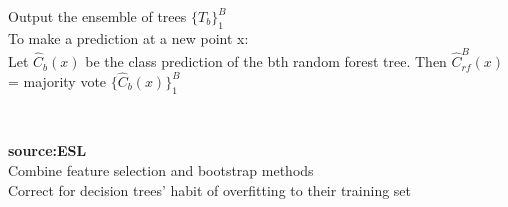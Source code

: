 \documentclass[xcolor={x11names,svgnames,dvipsnames}]{beamer}
\begin{document}
\begin{frame}
\begin{columns}
\begin{column}{.5\textwidth}
{\begin{algorithm}[H]
{{				         		    }				         		    
				         		    }
				         		    \nl Output the ensemble of trees $\{T_b\}_1^B$ \\
				         		    To make a prediction at a new point x:\\
				         		    \nl Let $\hat{C}_b(x)$ be the class prediction of the bth random forest tree. Then $\hat{C}_{rf}^B(x)$= majority vote $\{\hat{C}_b(x)\}_1^{B}$
			\end{algorithm} \\
				         		   }
		
	    \small{\textbf{source:ESL}}\\
	    \alert{\textbullet Combine feature selection and bootstrap methods}\\
	    \alert {\textbullet Correct for decision trees' habit of overfitting to their training set}
	\end{column}
\end{columns}	
\end{frame}

\end{document}
